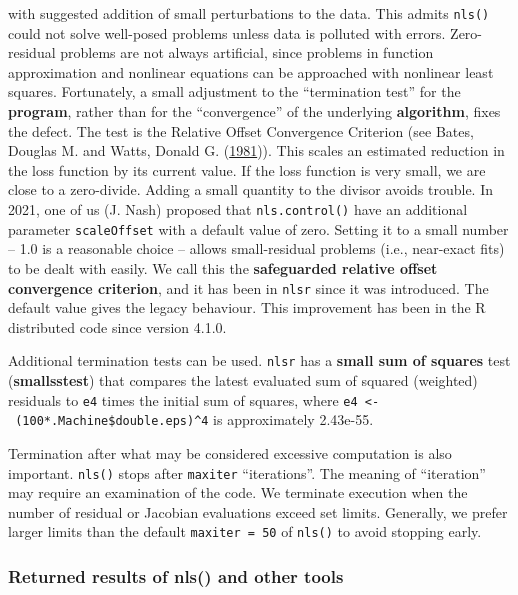 \documentclass[
]{article}
\begin{document}
with suggested addition of small perturbations to the data. This admits
\texttt{nls()} could not solve well-posed problems unless data is
polluted with errors. Zero-residual problems are not always artificial,
since problems in function approximation and nonlinear equations can be
approached with nonlinear least squares. Fortunately, a small adjustment
to the ``termination test'' for the \textbf{program}, rather than for
the ``convergence'' of the underlying \textbf{algorithm}, fixes the
defect. The test is the Relative Offset Convergence Criterion (see
Bates, Douglas M. and Watts, Donald G.
(\protect\hyperlink{ref-BatesWatts81}{1981})). This scales an estimated
reduction in the loss function by its current value. If the loss
function is very small, we are close to a zero-divide. Adding a small
quantity to the divisor avoids trouble. In 2021, one of us (J. Nash)
proposed that \texttt{nls.control()} have an additional parameter
\texttt{scaleOffset} with a default value of zero. Setting it to a small
number -- 1.0 is a reasonable choice -- allows small-residual problems
(i.e., near-exact fits) to be dealt with easily. We call this the
\textbf{safeguarded relative offset convergence criterion}, and it has
been in \texttt{nlsr} since it was introduced. The default value gives
the legacy behaviour. This improvement has been in the R distributed
code since version 4.1.0.

Additional termination tests can be used. \texttt{nlsr} has a
\textbf{small sum of squares} test (\textbf{smallsstest}) that compares
the latest evaluated sum of squared (weighted) residuals to \texttt{e4}
times the initial sum of squares, where
\texttt{e4\ \textless{}-\ (100*.Machine\$double.eps)\^{}4} is
approximately 2.43e-55.

Termination after what may be considered excessive computation is also
important. \texttt{nls()} stops after \texttt{maxiter} ``iterations''.
The meaning of ``iteration'' may require an examination of the code. We
terminate execution when the number of residual or Jacobian evaluations
exceed set limits. Generally, we prefer larger limits than the default
\texttt{maxiter\ =\ 50} of \texttt{nls()} to avoid stopping early.

\hypertarget{returned-results-of-nls-and-other-tools}{%
\subsubsection{Returned results of nls() and other
tools}\label{returned-results-of-nls-and-other-tools}}
\end{document}
